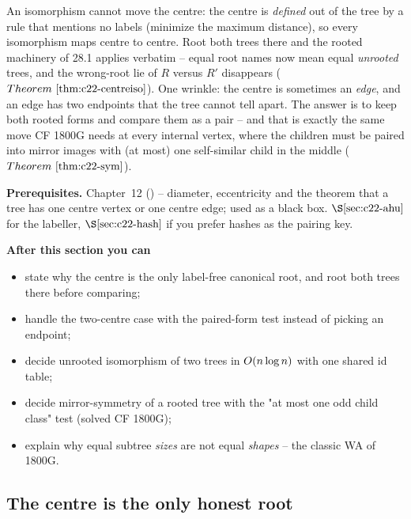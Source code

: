 \begin{topicintro}
An isomorphism cannot move the centre: the centre is \emph{defined} out of the
tree by a rule that mentions no labels (minimize the maximum distance), so every
isomorphism maps centre to centre.  Root both trees there and the rooted
machinery of 28.1 applies verbatim -- equal root names now mean equal
\emph{unrooted} trees, and the wrong-root lie of \(R\) versus \(R'\) disappears
(\(\thmref{c22-centreiso}\)).  One wrinkle: the centre is sometimes an
\emph{edge}, and an edge has two endpoints that the tree cannot tell apart.  The
answer is to keep both rooted forms and compare them as a pair -- and that is
exactly the same move CF 1800G needs at every internal vertex, where the children
must be paired into mirror images with (at most) one self-similar child in the
middle (\(\thmref{c22-sym}\)).

\textbf{Prerequisites.} Chapter~12 () -- diameter, eccentricity and
the theorem that a tree has one centre vertex or one centre edge; used as a black
box.  \(\secref{c22-ahu}\) for the labeller, \(\secref{c22-hash}\) if you prefer
hashes as the pairing key.

\textbf{After this section you can}
\begin{itemize}[nosep]
  \item state why the centre is the only label-free canonical root, and root both trees there before comparing; \hfill{}
  \item handle the two-centre case with the paired-form test instead of picking an endpoint; \hfill{}
  \item decide unrooted isomorphism of two trees in \(O(n\log n)\) with one shared id table; \hfill{}
  \item decide mirror-symmetry of a rooted tree with the "at most one odd child class" test (solved CF 1800G); \hfill{}
  \item explain why equal subtree \emph{sizes} are not equal \emph{shapes} -- the classic WA of 1800G. \hfill{}
\end{itemize}
\end{topicintro}

\subsection{The centre is the only honest root}

